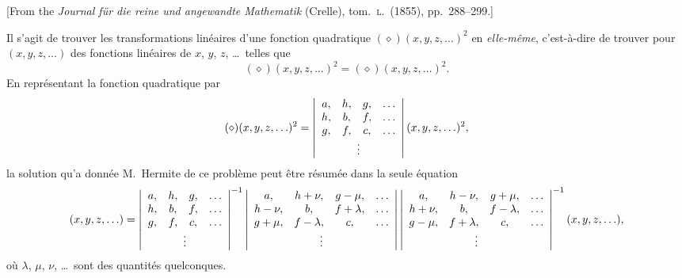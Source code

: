 \documentclass[11pt,a4paper]{article}
\begin{document}
[From the \textit{Journal f\"ur die reine und angewandte Mathematik} (Crelle), tom.\ \textsc{l}.\ (1855), pp.\ 288--299.]

\medskip

\noindent Il s'agit de trouver les transformations lin\'eaires d'une fonction quadratique $(\diamond)(x,y,z,\ldots)^2$ en \textit{elle-m\^eme}, c'est-\`a-dire de trouver pour $(x,y,z,\ldots)$ des fonctions lin\'eaires de $x$, $y$, $z$, \ldots\ telles que
\[
(\diamond)(x,y,z,\ldots)^2 = (\diamond)(x,y,z,\ldots)^2.
\]
En repr\'esentant la fonction quadratique par
\[
(\diamond)(x,y,z,\ldots)^2 = \left\lvert\begin{array}{cccc}
a , & h , & g , & \ldots\\
h , & b , & f , & \ldots\\
g , & f , & c , & \ldots\\
\multicolumn{4}{c}{\vdots}
\end{array}\right\rvert (x,y,z,\ldots)^2,
\]
la solution qu'a donn\'ee M.~Hermite de ce probl\`eme peut \^etre r\'esum\'ee dans la seule \'equation
\[
(x,y,z,\ldots) =
\left\lvert\begin{array}{cccc}
a, & h, & g, & \ldots\\
h, & b, & f, & \ldots\\
g, & f, & c, & \ldots\\
\multicolumn{4}{c}{\vdots}
\end{array}\right\rvert^{-1}
\left\lvert\begin{array}{cccc}
a, & h + \nu, & g - \mu, & \ldots\\
h - \nu, & b, & f + \lambda, & \ldots\\
g + \mu, & f - \lambda, & c, & \ldots\\
\multicolumn{4}{c}{\vdots}
\end{array}\right\rvert
\left\lvert\begin{array}{cccc}
a, & h - \nu, & g + \mu, & \ldots\\
h + \nu, & b, & f - \lambda, & \ldots\\
g - \mu, & f + \lambda, & c, & \ldots\\
\multicolumn{4}{c}{\vdots}
\end{array}\right\rvert^{-1} (x,y,z,\ldots),
\]
o\`u $\lambda$, $\mu$, $\nu$, \ldots\ sont des quantit\'es quelconques.

\medskip
\end{document}
